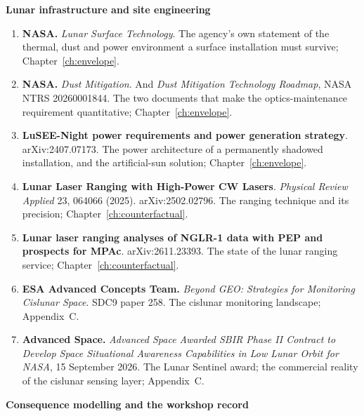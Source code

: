 \vspace{8pt}
{\sffamily\bfseries\small Lunar infrastructure and site engineering}

\begin{enumerate}[leftmargin=2.9em,itemsep=4pt,resume]

\item \textbf{NASA.} \emph{Lunar Surface Technology}. The agency's own
statement of the thermal, dust and power environment a surface installation
must survive; Chapter~\ref{ch:envelope}.

\item \textbf{NASA.} \emph{Dust Mitigation}. And \emph{Dust Mitigation
Technology Roadmap}, NASA NTRS 20260001844. The two documents that make the
optics-maintenance requirement quantitative; Chapter~\ref{ch:envelope}.

\item \textbf{LuSEE-Night power requirements and power generation strategy}.
arXiv:2407.07173. The power architecture of a permanently shadowed
installation, and the artificial-sun solution; Chapter~\ref{ch:envelope}.

\item \textbf{Lunar Laser Ranging with High-Power CW Lasers}.
\emph{Physical Review Applied} 23, 064066 (2025). arXiv:2502.02796. The
ranging technique and its precision; Chapter~\ref{ch:counterfactual}.

\item \textbf{Lunar laser ranging analyses of NGLR-1 data with PEP and
prospects for MPAc}. arXiv:2611.23393. The state of the lunar ranging
service; Chapter~\ref{ch:counterfactual}.

\item \textbf{ESA Advanced Concepts Team.} \emph{Beyond GEO: Strategies for
Monitoring Cislunar Space}. SDC9 paper 258. The cislunar monitoring
landscape; Appendix~C.

\item \textbf{Advanced Space.} \emph{Advanced Space Awarded SBIR Phase II
Contract to Develop Space Situational Awareness Capabilities in Low Lunar Orbit
for NASA}, 15 September 2026. The Lunar Sentinel award; the commercial
reality of the cislunar sensing layer; Appendix~C.

\end{enumerate}

\vspace{8pt}
{\sffamily\bfseries\small Consequence modelling and the workshop record}

